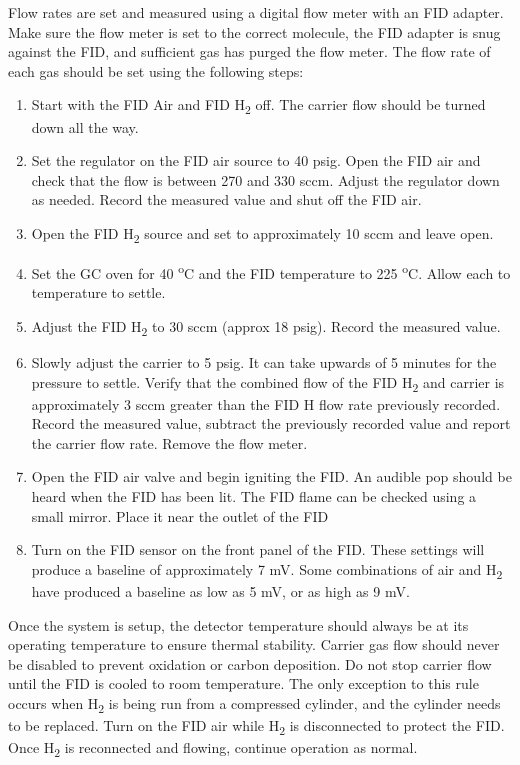 Flow rates are set and measured using a digital flow meter with an FID adapter. Make sure the flow meter is set to the correct molecule, the FID adapter is snug against the FID, and sufficient gas has purged the flow meter. The flow rate of each gas should be set using the following steps:
\begin{enumerate}
    \item Start with the FID Air and FID H\textsubscript{2} off. The carrier flow should be turned down all the way.
    \item Set the regulator on the FID air source to 40 psig. Open the FID air and check that the flow is between 270 and 330 sccm. Adjust the regulator down as needed. Record the measured value and shut off the FID air.
    \item Open the FID H\textsubscript{2} source and set to approximately 10 sccm and leave open.
    \item Set the GC oven for 40 \textsuperscript{o}C and the FID temperature to 225 \textsuperscript{o}C. Allow each to temperature to settle.
    \item Adjust the FID H\textsubscript{2} to 30 sccm (approx 18 psig). Record the measured value.
    \item Slowly adjust the carrier to 5 psig. It can take upwards of 5 minutes for the pressure to settle. Verify that the combined flow of the FID H\textsubscript{2} and carrier is approximately 3 sccm greater than the FID H flow rate previously recorded. Record the measured value, subtract the previously recorded value and report the carrier flow rate. Remove the flow meter.
    \item Open the FID air valve and begin igniting the FID. An audible pop should be heard when the FID has been lit. The FID flame can be checked using a small mirror. Place it near the outlet of the FID
    \item Turn on the FID sensor on the front panel of the FID. These settings will produce a baseline of approximately 7 mV. Some combinations of air and H\textsubscript{2} have produced a baseline as low as 5 mV, or as high as 9 mV.
\end{enumerate}

Once the system is setup, the detector temperature should always be at its operating temperature to ensure thermal stability. Carrier gas flow should never be disabled to prevent oxidation or carbon deposition. Do not stop carrier flow until the FID is cooled to room temperature. The only exception to this rule occurs when H\textsubscript{2} is being run from a compressed cylinder, and the cylinder needs to be replaced. Turn on the FID air while H\textsubscript{2} is disconnected to protect the FID. Once H\textsubscript{2} is reconnected and flowing, continue operation as normal.

